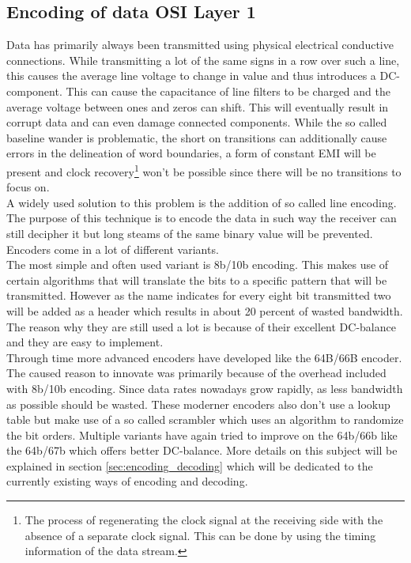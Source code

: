 \subsection[Encoding of data]{Encoding of data \hfill OSI Layer 1}
\label{Sub:Structure_Encoding}
Data has primarily always been transmitted using physical electrical conductive connections. While transmitting a lot of the same signs in a row over such a line, this causes the average line voltage to change in value and thus introduces a DC-component. This can cause the capacitance of line filters to be charged and the average voltage between ones and zeros can shift. This will eventually result in corrupt data and can even damage connected components. While the so called baseline wander is problematic, the short on transitions can additionally cause errors in the delineation of word boundaries, a form of constant EMI will be present and clock recovery\footnote{The process of regenerating the clock signal at the receiving side with the absence of a separate clock signal. This can be done by using the timing information of the data stream.} won't be possible since there will be no transitions to focus on. \\

A widely used solution to this problem is the addition of so called line encoding. The purpose of this technique is to encode the data in such way the receiver can still decipher it but long steams of the same binary value will be prevented. Encoders come in a lot of different variants. \\

The most simple and often used variant is 8b/10b encoding. This makes use of certain algorithms that will translate the bits to a specific pattern that will be transmitted. However as the name indicates for every eight bit transmitted two will be added as a header which results in about 20 percent of wasted bandwidth. The reason why they are still used a lot is because of their excellent DC-balance and they are easy to implement.\\

Through time more advanced encoders have developed like the 64B/66B encoder. The caused reason to innovate was primarily because of the overhead included with 8b/10b encoding. Since data rates nowadays grow rapidly, as less bandwidth as possible should be wasted. These moderner encoders also don't use a lookup table but make use of a so called scrambler which uses an algorithm to randomize the bit orders. Multiple variants have again tried to improve on the 64b/66b like the 64b/67b which offers better DC-balance. More details on this subject will be explained in section \ref{sec:encoding_decoding} which will be dedicated to the currently existing ways of encoding and decoding.

